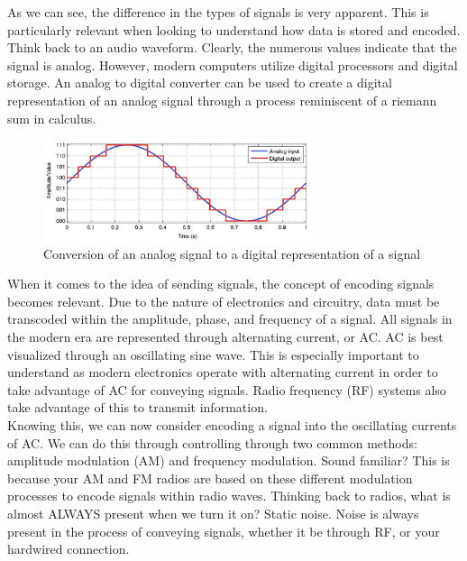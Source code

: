 \documentclass[11pt]{article}
\begin{document}
As we can see, the difference in the types of signals is very apparent. This is particularly relevant when looking to understand how data is stored and encoded. Think back to an audio waveform. Clearly, the numerous values indicate that the signal is analog. However, modern computers utilize digital processors and digital storage. An analog to digital converter can be used to create a digital representation of an analog signal through a process reminiscent of a riemann sum in calculus. 

\begin{figure}[H]
    \begin{center}
    \includegraphics[width = 300px]{figures/adc.jpg}
    \caption{Conversion of an analog signal to a digital representation of a signal \cite{website:adc}}
    \label{fig:adc}
    \end{center} 
\end{figure}

When it comes to the idea of sending signals, the concept of encoding signals becomes relevant. Due to the nature of electronics and circuitry, data must be transcoded within the amplitude, phase, and frequency of a signal. All signals in the modern era are represented through alternating current, or AC. AC is best visualized through an oscillating sine wave. This is especially important to understand as modern electronics operate with alternating current in order to take advantage of AC for conveying signals. Radio frequency (RF) systems also take advantage of this to transmit information.\\

Knowing this, we can now consider encoding a signal into the oscillating currents of AC. We can do this through controlling through two common methods: amplitude modulation (AM) and frequency modulation. Sound familiar? This is because your AM and FM radios are based on these different modulation processes to encode signals within radio waves. Thinking back to radios, what is almost ALWAYS present when we turn it on? Static noise. Noise is always present in the process of conveying signals, whether it be through RF, or your hardwired connection.\\ 
\end{document}
